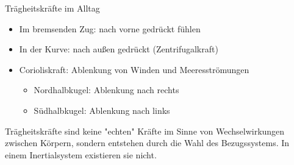 \begin{example}{Trägheitskräfte im Alltag}
    \begin{itemize}
        \item Im bremsenden Zug: nach vorne gedrückt fühlen
        \item In der Kurve: nach außen gedrückt (Zentrifugalkraft)
        \item Corioliskraft: Ablenkung von Winden und Meeresströmungen
        \begin{itemize}
            \item Nordhalbkugel: Ablenkung nach rechts
            \item Südhalbkugel: Ablenkung nach links
        \end{itemize}
    \end{itemize}
\end{example}

\begin{remark}
    Trägheitskräfte sind keine "echten" Kräfte im Sinne von Wechselwirkungen zwischen Körpern, sondern entstehen durch die Wahl des Bezugssystems. In einem Inertialsystem existieren sie nicht.
\end{remark}